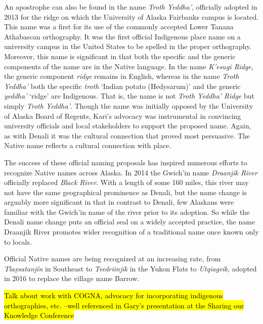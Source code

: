 An apostrophe can also be found in the name \textit{Troth Yeddha'}, officially adopted in 2013 for the ridge on which the University of Alaska Fairbanks campus is located. This name was a first for its use of the commonly accepted Lower Tanana Athabascan orthography. It was the first official Indigenous place name on a university campus in the United States to be spelled in the proper orthography. Moreover, this name is significant in that both the specific and the generic components of the name are in the Native language. In the name \textit{K'esugi Ridge}, the generic component \textit{ridge} remains in English, whereas in the name \textit{Troth Yeddha'} both the specific \textit{troth} `Indian potato (Hedysarum)' and the generic \textit{yeddha'} `ridge' are Indigenous. That is, the name is not \textit{Troth Yeddha' Ridge} but simply \textit{Troth Yeddha'}.  Though the name was initially opposed by the University of Alaska Board of Regents, Kari's advocacy was instrumental in convincing university officials and local stakeholders to support the proposed name. Again, as with Denali it was the cultural connection that proved most persuasive. The Native name reflects a cultural connection with place.

The success of these official naming proposals has inspired numerous efforts to recognize Native names across Alaska. In 2014 the Gwich'in name \textit{Draanjik River} officially replaced \textit{Black River}. With a length of some 160 miles, this river may not have the same geographical prominence as Denali, but the name change is arguably more significant in that in contrast to Denali, few Alaskans were familiar with the Gwich'in name of the river prior to its adoption. So while the Denali name change puts an official seal on a widely accepted practice, the name Draanjik River promotes wider recognition of a traditional name once known only to locals.

Official Native names are being recognized at an increasing rate, from \textit{Tlax̲satanjín} in Southeast to \textit{Teedriinjik} in the Yukon Flats to \textit{Utqiagvik}, adopted in  2016 to replace the village name Barrow.

\hl{Talk about work with COGNA, advocacy for incorporating indigenous orthographies, etc. –well referenced in Gary’s presentation at the Sharing our Knowledge Conference}

